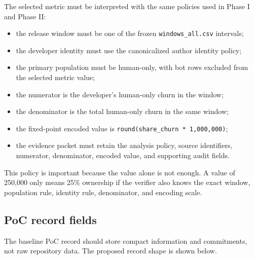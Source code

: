 The selected metric must be interpreted with the same policies used in Phase I and Phase II:
\begin{itemize}[leftmargin=*]
  \item the release window must be one of the frozen \texttt{windows\_all.csv} intervals;
  \item the developer identity must use the canonicalized author identity policy;
  \item the primary population must be human-only, with bot rows excluded from the selected metric value;
  \item the numerator is the developer's human-only churn in the window;
  \item the denominator is the total human-only churn in the same window;
  \item the fixed-point encoded value is \texttt{round(share\_churn * 1,000,000)};
  \item the evidence packet must retain the analysis policy, source identifiers, numerator, denominator, encoded value, and supporting audit fields.
\end{itemize}

This policy is important because the value alone is not enough. A value of 250,000 only means 25\% ownership if
the verifier also knows the exact window, population rule, identity rule, denominator, and encoding scale.

\subsection{PoC record fields}
\label{sec:selected_metric_record_fields}

The baseline PoC record should store compact information and commitments, not raw repository data. The proposed
record shape is shown below.

